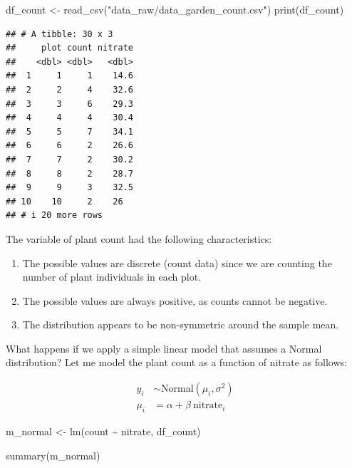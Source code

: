 \documentclass[
]{article}
\newenvironment{Shaded}{\begin{snugshade}}{\end{snugshade}}
\newcommand{\FunctionTok}[1]{\textcolor[rgb]{0.00,0.00,0.00}{#1}}
\newcommand{\NormalTok}[1]{#1}
\newcommand{\OtherTok}[1]{\textcolor[rgb]{0.56,0.35,0.01}{#1}}
\newcommand{\SpecialCharTok}[1]{\textcolor[rgb]{0.00,0.00,0.00}{#1}}
\newcommand{\StringTok}[1]{\textcolor[rgb]{0.31,0.60,0.02}{#1}}
\begin{document}
\begin{Shaded}
\begin{Highlighting}[]
\NormalTok{df\_count }\OtherTok{\textless{}{-}} \FunctionTok{read\_csv}\NormalTok{(}\StringTok{"data\_raw/data\_garden\_count.csv"}\NormalTok{)}
\FunctionTok{print}\NormalTok{(df\_count)}
\end{Highlighting}
\end{Shaded}

\begin{verbatim}
## # A tibble: 30 x 3
##     plot count nitrate
##    <dbl> <dbl>   <dbl>
##  1     1     1    14.6
##  2     2     4    32.6
##  3     3     6    29.3
##  4     4     4    30.4
##  5     5     7    34.1
##  6     6     2    26.6
##  7     7     2    30.2
##  8     8     2    28.7
##  9     9     3    32.5
## 10    10     2    26  
## # i 20 more rows
\end{verbatim}

The variable of plant count had the following characteristics:

\begin{enumerate}
\def\labelenumi{\arabic{enumi}.}
\item
  The possible values are discrete (count data) since we are counting the number of plant individuals in each plot.
\item
  The possible values are always positive, as counts cannot be negative.
\item
  The distribution appears to be non-symmetric around the sample mean.
\end{enumerate}

What happens if we apply a simple linear model that assumes a Normal distribution? Let me model the plant count as a function of nitrate as follows:

\[
\begin{aligned}
y_i &\sim \text{Normal}(\mu_i, \sigma^2)\\
\mu_i &= \alpha + \beta~\text{nitrate}_i
\end{aligned}
\]

\begin{Shaded}
\begin{Highlighting}[]
\NormalTok{m\_normal }\OtherTok{\textless{}{-}} \FunctionTok{lm}\NormalTok{(count }\SpecialCharTok{\textasciitilde{}}\NormalTok{ nitrate,}
\NormalTok{               df\_count)}

\FunctionTok{summary}\NormalTok{(m\_normal)}
\end{Highlighting}
\end{Shaded}
\end{document}
